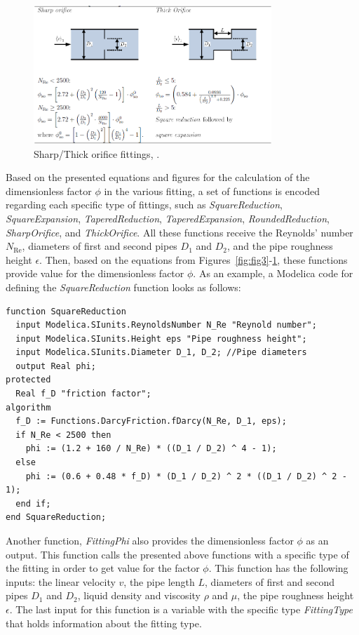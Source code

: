 \documentclass[%
]{USN-PhD}
\begin{document}
\begin{figure}[!ht]
  \centering
 \includegraphics[width=0.8\textwidth]{fig/Sharp_fit}
 \caption{Sharp/Thick orifice fittings, \cite{LieL:18}.}
  \label{fig:fig6}
\end{figure}

Based on the presented equations and figures for the calculation of the dimensionless factor $\phi$ in the various fitting, a set of functions is encoded regarding each specific type of fittings, such as \emph{SquareReduction}, \emph{SquareExpansion}, \emph{TaperedReduction}, \emph{TaperedExpansion}, \emph{RoundedReduction}, \emph{SharpOrifice}, and \emph{ThickOrifice}. All these functions receive the Reynolds' number $N_\mathrm{Re}$, diameters of first and second pipes $D_1$ and $D_2$, and the pipe roughness height $\epsilon$. Then, based on the equations from Figures~\ref{fig:fig3}-\ref{fig:fig6}, these functions provide value for the dimensionless factor $\phi$. As an example, a Modelica code for defining the \emph{SquareReduction} function looks as follows:

\begin{lstlisting}[language = modelica]
function SquareReduction
  input Modelica.SIunits.ReynoldsNumber N_Re "Reynold number";
  input Modelica.SIunits.Height eps "Pipe roughness height";
  input Modelica.SIunits.Diameter D_1, D_2; //Pipe diameters
  output Real phi;
protected
  Real f_D "friction factor";
algorithm
  f_D := Functions.DarcyFriction.fDarcy(N_Re, D_1, eps);
  if N_Re < 2500 then
    phi := (1.2 + 160 / N_Re) * ((D_1 / D_2) ^ 4 - 1);
  else
    phi := (0.6 + 0.48 * f_D) * (D_1 / D_2) ^ 2 * ((D_1 / D_2) ^ 2 - 1);
  end if;
end SquareReduction;
\end{lstlisting}

Another function, \emph{FittingPhi} also provides the dimensionless factor $\phi$ as an output. This function calls the presented above functions with a specific type of the fitting in order to get value for the factor $\phi$. This function has the following inputs: the linear velocity $v$, the pipe length $L$, diameters of first and second pipes $D_1$ and $D_2$, liquid density and viscosity $\rho$ and $\mu$, the pipe roughness height $\epsilon$. The last input for this function is a variable with the specific type \emph{FittingType} that holds information about the fitting type.
\end{document}
